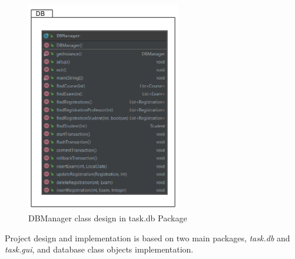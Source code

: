 \documentclass{report}
\begin{document}
\begin{figure}[ht]
	\centering
	\includegraphics[width=0.6\textwidth]{jpa-DBPackage.png}
	\caption{DBManager class design in task.db Package}
\end{figure}


Project design and implementation is based on two main packages, \textit{task.db} and \textit{task.gui}, and database class objects implementation.
\end{document}
